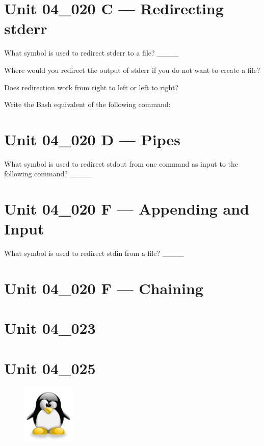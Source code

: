 \documentclass[letterpaper,12pt]{exam}
\newcommand{\unit}{Unit 04}
\begin{document}
\begin {questions}
\section*{\unit\_020 C --- Redirecting stderr} %

\question What symbol is used to redirect stderr to a file? \_\_\_\_

\question Where would you redirect the output of stderr if you do not want to create a file?

\question Does redirection work from right to left or left to right?

\question Write the Bash equivalent of the following command:\newline
\centerline{}
\vspace{5mm}

\section*{\unit\_020 D --- Pipes}

\question What symbol is used to redirect stdout from one command as input to the following command? \_\_\_\_




\section*{\unit\_020 F --- Appending and Input} %
\question What symbol is used to redirect stdin from a file? \_\_\_\_

\section*{\unit\_020 F --- Chaining} %

\section*{\unit\_023} %

\section*{\unit\_025} %


\end{questions}
\begin{figure}[b]\label{end}
	\center
	\includegraphics[width=1in]{tux}
	{}
\end{figure}
\end{document}
